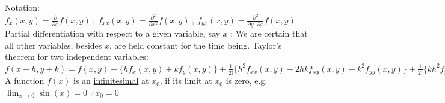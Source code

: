 \documentclass[12pt]{article}
\begin{document}
\begin{flushleft}
	\textbullet \quad Notation: $\displaystyle f_x(x,y) = \frac{\partial}{\partial x} f(x,y) \ , \ f_{xx} (x,y) = \frac{\partial^2}{\partial x^2} f(x,y) \ , \ f_{yx} (x,y) = \frac{\partial^2}{\partial y \cdot \partial x} f(x,y)$ \linebreak 
	\textbullet \quad Partial differentiation with respect to a given variable, say $x$  :  We are certain that all other variables, besides $x$, are held constant for the time being. \linebreak 
	\textbullet \quad Taylor's theorem for two independent variables: $\displaystyle f(x+h, y+k) = f(x,y) + \{ hf_x (x,y) + kf_y (x,y) \} + \frac{1}{2!} \{ h^2 f_{xx} (x,y) + 2hkf_{xy} (x,y) + k^2 f_{yy} (x,y) \} + \frac{1}{2!} \{ kh^2 f_{yxx} (x,y) + k^2 h f_{yyx} (x,y) \} + \ldots $ \linebreak 
	\textbullet \quad A function $f(x)$ is an \uline{infinitesimal} at $x_0$, if its limit at $x_0$ is zero, e.g. $\lim_{x\to 0} \sin (x) = 0 \ \ \therefore x_0 = 0$ \linebreak 
	

\end{flushleft}
\end{document}
